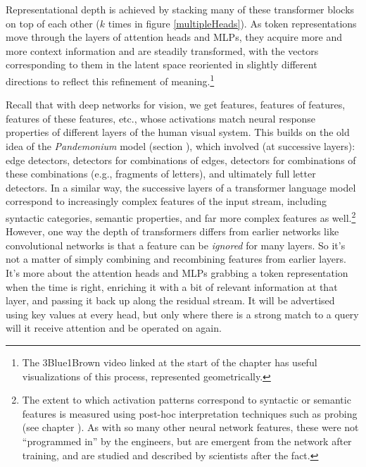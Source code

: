 Representational depth is achieved by  stacking many of these
transformer blocks on top of each other ($k$ times in figure
\ref{multipleHeads}). As token representations move
through the layers of attention heads and MLPs, they acquire more and more
context information and are steadily transformed, with the vectors
corresponding to them in the latent space reoriented in slightly different
directions to reflect this refinement of meaning.\footnote{The 3Blue1Brown
video linked at the start of the chapter has useful visualizations of this
process, represented geometrically.} 

Recall that with deep networks for vision,
we get features, features of features, features of these features, etc., whose
activations match neural response properties of different layers of the human
visual system. This builds on the old idea of the \emph{Pandemonium} model
(section ), which involved (at successive layers): edge
detectors, detectors for combinations of edges, detectors for combinations of
these combinations (e.g., fragments of letters), and ultimately full letter
detectors. In a similar way, the successive layers of a transformer language
model correspond to increasingly complex features of the input stream,
including syntactic categories, semantic properties, and far more complex
features as well.\footnote{The extent to which activation patterns correspond
to syntactic or semantic features is measured using post-hoc interpretation
techniques such as probing (see chapter ). As with so many other neural network features,
these were not ``programmed in'' by the engineers, but are emergent from the
network after training, and are studied and described by scientists after the
fact.} However, one way the depth of transformers differs from earlier networks like convolutional networks is that a feature can be \emph{ignored} for many layers.  So it's not a matter of simply combining and recombining features from earlier layers. It's more about the attention heads and MLPs grabbing a token representation when the time is right, enriching it with a bit of relevant information at that layer, and passing it back up along the residual stream. It will be advertised using key values at every head, but only where there is a strong match to a query will it receive attention and be operated on again.

